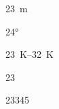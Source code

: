 \documentclass{article}
\begin{document}
\qty{23}{\meter}


\ang{24}

\qtyrange{23}{32}{\kelvin}


\num{23}

\numlist{23 34 5}
\end{document}
